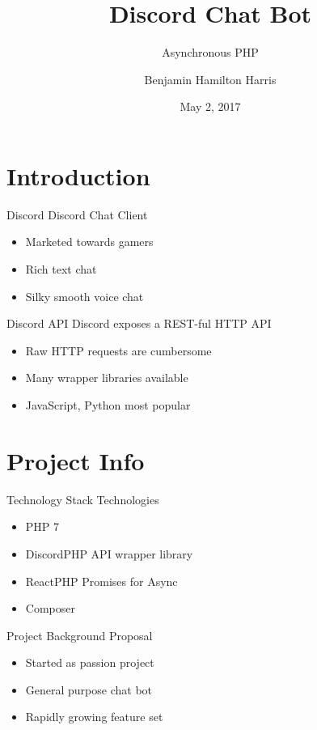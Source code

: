 \documentclass{beamer}
\title{Discord Chat Bot}
\subtitle{Asynchronous PHP}
\date{May 2, 2017}
\author{Benjamin Hamilton Harris}
\institute{Northern Michigan University}
\begin{document}
\maketitle


\section{Introduction}

\begin{frame}{Discord}
    Discord Chat Client
    \begin{itemize}
        \item Marketed towards gamers
        \item Rich text chat
        \item Silky smooth voice chat
    \end{itemize}

\end{frame}


\begin{frame}{Discord API}
	Discord exposes a REST-ful HTTP API
	\begin{itemize}
		\item Raw HTTP requests are cumbersome
		\item Many wrapper libraries available
		\item JavaScript, Python most popular
	\end{itemize}

\end{frame}


\section{Project Info}

\begin{frame}{Technology Stack}
	Technologies
	\begin{itemize}
		\item PHP 7
		\item DiscordPHP API wrapper library
		\item ReactPHP Promises for Async
		\item Composer
	\end{itemize}

\end{frame}


\begin{frame}{Project Background}
	Proposal
	\begin{itemize}
		\item Started as passion project
		\item General purpose chat bot
		\item Rapidly growing feature set
	\end{itemize}
	
\end{frame}
\end{document}

